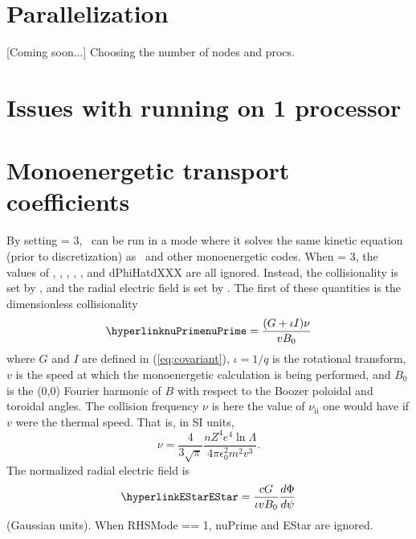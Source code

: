 \section{Parallelization}
[Coming soon...] Choosing the number of nodes and procs.

\section{Issues with running on 1 processor}

\section{Monoenergetic transport coefficients}
\label{sec:monoenergetic}

By setting  = 3, \sfincs~can be run in a mode
where it solves the same kinetic equation (prior to discretization) as 
\dkes~and other monoenergetic codes.
When  = 3, the values of , , ,
, , and {\ttfamily dPhiHatdXXX} are all ignored.
Instead, the collisionality is set by , and the radial electric field is set
by .  The first of these quantities is the dimensionless collisionality
\begin{equation}
\mbox{\parlink{nuPrime}} = \frac{(G+\iota I) \nu}{v B_0}
\end{equation}
where $G$ and $I$ are defined in (\ref{eq:covariant}), $\iota=1/q$ is the rotational transform,
$v$ is the speed at which the monoenergetic calculation is being performed, and $B_0$ is the (0,0) Fourier harmonic of $B$
with respect to the Boozer poloidal and toroidal angles. The collision
frequency $\nu$ is here the value of $\nu_\mathrm{ii}$ one would have if
$v$ were the thermal speed. That is, in SI units,
\begin{equation}
  \nu=\frac{4}{3\sqrt{\pi}}\frac{n Z^4e^4\ln \Lambda}{4\pi\epsilon_0^2m^2v^3}.
\end{equation}
%
The normalized radial electric field is
\begin{equation}
\mbox{\parlink{EStar}} = \frac{cG}{\iota v B_0} \frac{d\Phi}{d\psi}
\end{equation}
(Gaussian units).
When {\ttfamily RHSMode} == 1, {\ttfamily nuPrime} and {\ttfamily EStar} are ignored.

